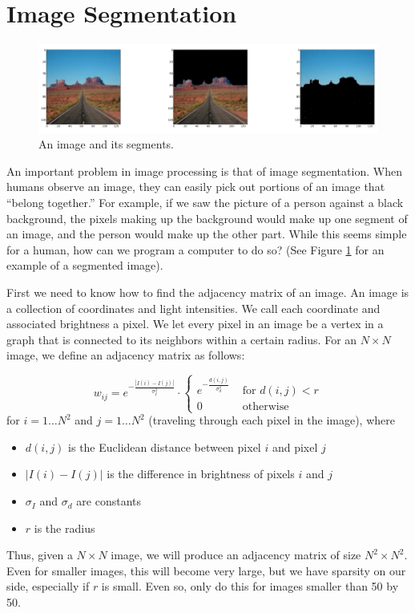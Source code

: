 \section*{Image Segmentation}

\begin{figure}
\centering
\includegraphics[width=\textwidth]{monuments.png}
\caption{An image and its segments.}
\label{fig:monument}
\end{figure}

An important problem in image processing is that of image segmentation.
When humans observe an image, they can easily pick out portions of an image that ``belong together.''
For example, if we saw the picture of a person against a black background, the pixels making up the background would make up one segment of an image, and the person would make up the other part.
While this seems simple for a human, how can we program a computer to do so? (See Figure \ref{fig:monument} for an example of a segmented image).

First we need to know how to find the adjacency matrix of an image.
An image is a collection of coordinates and light intensities.
We call each coordinate and associated brightness a pixel.
We let every pixel in an image be a vertex in a graph that is connected to its neighbors within a certain radius.
For an $N \times N$ image, we define an adjacency matrix as follows:

\begin{equation}
\label{eq:adjacency}
w_{ij} = e^{-\frac{|I(i) - I(j)|}{\sigma_I^2}} \cdot \begin{cases} e^{-\frac{d(i,j)}{\sigma_d^2}} & \mbox{ for $d(i,j) < r$} \\ 0 & \mbox{ otherwise} \end{cases}
\end{equation}
for $i = 1 \hdots N^2$ and $j = 1 \hdots N^2$ (traveling through each pixel in the image), where
\begin{itemize}
	\item$d(i,j)$ is the Euclidean distance between pixel $i$ and pixel $j$
	\item $|I(i) - I(j)|$ is the difference in brightness of pixels $i$ and $j$
	\item $\sigma_I$ and $\sigma_d$ are constants
	\item $r$ is the radius
\end{itemize}
Thus, given a $N\times N$ image, we will produce an adjacency matrix of size $N^2\times N^2$.
Even for smaller images, this will become very large, but we have sparsity on our side, especially if $r$ is small.
Even so, only do this for images smaller than 50 by 50.

